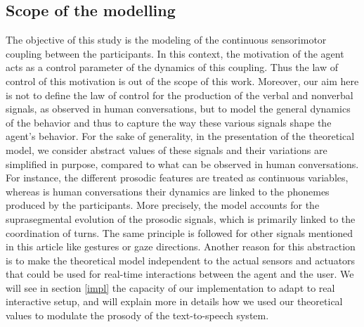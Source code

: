\subsection{Scope of the modelling}

The objective of this study is the modeling of the continuous sensorimotor coupling between the participants. In this context, the motivation of the agent acts as a control parameter of the dynamics of this coupling. Thus the law of control of this motivation is out of the scope of this work.
Moreover, our aim here is not to define the law of control for the production of the verbal and nonverbal signals, as observed in human conversations, but to model the general dynamics of the behavior and thus to capture the way these various signals shape the agent's behavior. For the sake of generality, in the presentation of the theoretical model, we consider abstract values of these signals and their variations are simplified in purpose, compared to what can be observed in human conversations.
For instance, the different prosodic features are treated as continuous variables, whereas is human conversations their dynamics are linked to the phonemes produced by the participants. More precisely, the model accounts for the suprasegmental evolution of the prosodic signals, which is primarily linked to the coordination of turns.
The same principle is followed for other signals mentioned in this article like gestures or gaze directions. 
Another reason for this abstraction %
is to make the  theoretical model independent to the actual sensors and actuators that could be used for real-time interactions between the agent and the user. 
We will see in section \ref{impl} the capacity of our implementation to adapt to real interactive setup, and will explain more in details how we used our theoretical values to modulate the prosody of the text-to-speech system.

